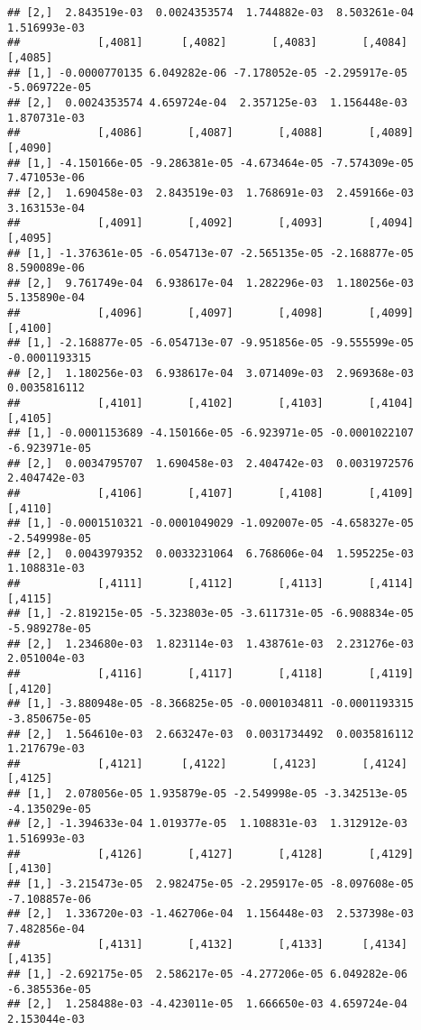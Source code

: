 \documentclass[
]{article}
\begin{document}
\begin{verbatim}
## [2,]  2.843519e-03  0.0024353574  1.744882e-03  8.503261e-04  1.516993e-03
##            [,4081]      [,4082]       [,4083]       [,4084]       [,4085]
## [1,] -0.0000770135 6.049282e-06 -7.178052e-05 -2.295917e-05 -5.069722e-05
## [2,]  0.0024353574 4.659724e-04  2.357125e-03  1.156448e-03  1.870731e-03
##            [,4086]       [,4087]       [,4088]       [,4089]      [,4090]
## [1,] -4.150166e-05 -9.286381e-05 -4.673464e-05 -7.574309e-05 7.471053e-06
## [2,]  1.690458e-03  2.843519e-03  1.768691e-03  2.459166e-03 3.163153e-04
##            [,4091]       [,4092]       [,4093]       [,4094]      [,4095]
## [1,] -1.376361e-05 -6.054713e-07 -2.565135e-05 -2.168877e-05 8.590089e-06
## [2,]  9.761749e-04  6.938617e-04  1.282296e-03  1.180256e-03 5.135890e-04
##            [,4096]       [,4097]       [,4098]       [,4099]       [,4100]
## [1,] -2.168877e-05 -6.054713e-07 -9.951856e-05 -9.555599e-05 -0.0001193315
## [2,]  1.180256e-03  6.938617e-04  3.071409e-03  2.969368e-03  0.0035816112
##            [,4101]       [,4102]       [,4103]       [,4104]       [,4105]
## [1,] -0.0001153689 -4.150166e-05 -6.923971e-05 -0.0001022107 -6.923971e-05
## [2,]  0.0034795707  1.690458e-03  2.404742e-03  0.0031972576  2.404742e-03
##            [,4106]       [,4107]       [,4108]       [,4109]       [,4110]
## [1,] -0.0001510321 -0.0001049029 -1.092007e-05 -4.658327e-05 -2.549998e-05
## [2,]  0.0043979352  0.0033231064  6.768606e-04  1.595225e-03  1.108831e-03
##            [,4111]       [,4112]       [,4113]       [,4114]       [,4115]
## [1,] -2.819215e-05 -5.323803e-05 -3.611731e-05 -6.908834e-05 -5.989278e-05
## [2,]  1.234680e-03  1.823114e-03  1.438761e-03  2.231276e-03  2.051004e-03
##            [,4116]       [,4117]       [,4118]       [,4119]       [,4120]
## [1,] -3.880948e-05 -8.366825e-05 -0.0001034811 -0.0001193315 -3.850675e-05
## [2,]  1.564610e-03  2.663247e-03  0.0031734492  0.0035816112  1.217679e-03
##            [,4121]      [,4122]       [,4123]       [,4124]       [,4125]
## [1,]  2.078056e-05 1.935879e-05 -2.549998e-05 -3.342513e-05 -4.135029e-05
## [2,] -1.394633e-04 1.019377e-05  1.108831e-03  1.312912e-03  1.516993e-03
##            [,4126]       [,4127]       [,4128]       [,4129]       [,4130]
## [1,] -3.215473e-05  2.982475e-05 -2.295917e-05 -8.097608e-05 -7.108857e-06
## [2,]  1.336720e-03 -1.462706e-04  1.156448e-03  2.537398e-03  7.482856e-04
##            [,4131]       [,4132]       [,4133]      [,4134]       [,4135]
## [1,] -2.692175e-05  2.586217e-05 -4.277206e-05 6.049282e-06 -6.385536e-05
## [2,]  1.258488e-03 -4.423011e-05  1.666650e-03 4.659724e-04  2.153044e-03

\end{verbatim}
\end{document}
